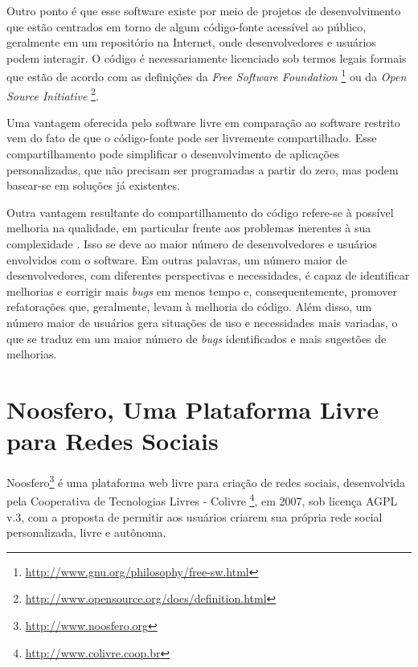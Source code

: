 Outro ponto é que esse software existe por meio de projetos de desenvolvimento
que estão centrados em torno de algum código-fonte acessível ao público,
geralmente em um repositório na Internet, onde desenvolvedores e usuários
podem interagir.
%
O código é necessariamente licenciado sob termos legais formais que estão de
acordo com as definições da \textit{Free Software Foundation}%
\footnote{\url{http://www.gnu.org/philosophy/free-sw.html}} ou da
\textit{Open Source Initiative}%
\footnote{\url{http://www.opensource.org/docs/definition.html}}.


Uma vantagem oferecida pelo software livre em comparação ao software
restrito vem do fato de que o código-fonte pode ser livremente compartilhado.
%
Esse compartilhamento pode simplificar o desenvolvimento de aplicações
personalizadas, que não precisam ser programadas a partir do zero, mas
podem basear-se em soluções já existentes.

Outra vantagem resultante do compartilhamento do código refere-se
à possível melhoria na qualidade, em particular frente aos
problemas inerentes à sua complexidade \cite{CatedralBazzar}.
%
Isso se deve ao maior número de desenvolvedores e usuários envolvidos
com o software. Em outras palavras, um número maior de desenvolvedores, com diferentes
perspectivas e necessidades, é capaz de identificar melhorias e corrigir
mais \emph{bugs} em menos tempo e, consequentemente, promover refatorações que,
geralmente, levam à melhoria do código.
%
Além disso, um número maior de usuários gera situações de uso e
necessidades mais variadas, o que se traduz em um maior número
de \emph{bugs} identificados e mais sugestões de melhorias.


\section{Noosfero, Uma Plataforma Livre para Redes Sociais}
\label{noosfero-section}

Noosfero\footnote{\url{http://www.noosfero.org}}
é uma  plataforma web livre para criação de redes sociais, desenvolvida
pela Cooperativa de Tecnologias Livres - Colivre%
\footnote{\url{http://www.colivre.coop.br}},
em 2007, sob licença AGPL v.3, com a proposta de permitir aos usuários criarem sua
própria rede social personalizada, livre e autônoma.

